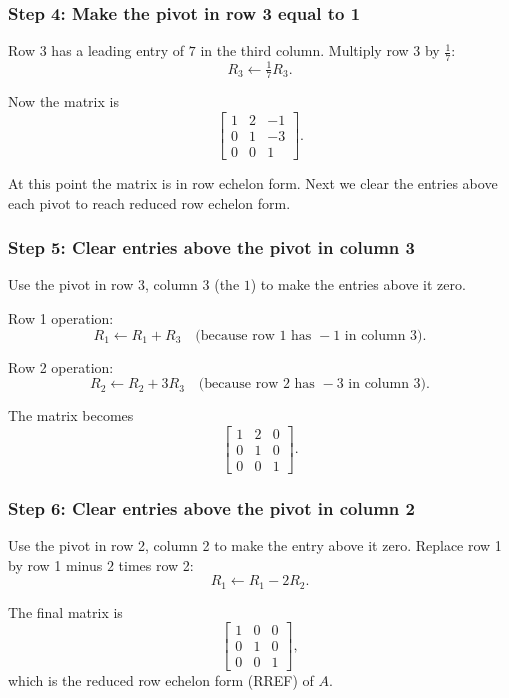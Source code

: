 \documentclass[12pt]{article}
\begin{document}
	\subsubsection*{Step 4: Make the pivot in row 3 equal to 1}
	
	Row 3 has a leading entry of $7$ in the third column. Multiply row 3 by $\frac{1}{7}$:
	\[
	R_3 \leftarrow \tfrac{1}{7} R_3.
	\]
	
	Now the matrix is
	\[
	\begin{bmatrix}
		1 & 2 & -1 \\
		0 & 1 & -3 \\
		0 & 0 & 1
	\end{bmatrix}.
	\]
	
	At this point the matrix is in row echelon form. Next we clear the entries above each pivot to reach reduced row echelon form.
	
	\subsubsection*{Step 5: Clear entries above the pivot in column 3}
	
	Use the pivot in row 3, column 3 (the $1$) to make the entries above it zero.
	
	Row 1 operation:
	\[
	R_1 \leftarrow R_1 + R_3
	\quad \text{(because row 1 has } -1 \text{ in column 3)}.
	\]
	
	Row 2 operation:
	\[
	R_2 \leftarrow R_2 + 3R_3
	\quad \text{(because row 2 has } -3 \text{ in column 3)}.
	\]
	
	The matrix becomes
	\[
	\begin{bmatrix}
		1 & 2 & 0 \\
		0 & 1 & 0 \\
		0 & 0 & 1
	\end{bmatrix}.
	\]
	
	\subsubsection*{Step 6: Clear entries above the pivot in column 2}
	
	Use the pivot in row 2, column 2 to make the entry above it zero. Replace row 1 by row 1 minus $2$ times row 2:
	\[
	R_1 \leftarrow R_1 - 2R_2.
	\]
	
	The final matrix is
	\[
	\begin{bmatrix}
		1 & 0 & 0 \\
		0 & 1 & 0 \\
		0 & 0 & 1
	\end{bmatrix},
	\]
	which is the reduced row echelon form (RREF) of $A$.
	
\end{document}
